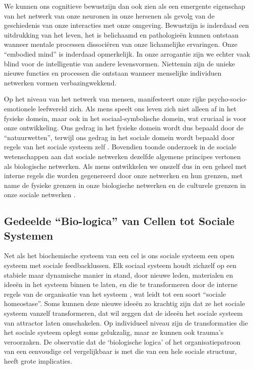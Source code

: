 \documentclass[
  11pt,
]{book}
\begin{document}
We kunnen ons cognitieve bewustzijn dan ook zien als een emergente eigenschap van het netwerk van onze neuronen in onze hersenen als gevolg van de geschiedenis van onze interacties met onze omgeving. Bewustzijn is inderdaad een uitdrukking van het leven, het is belichaamd en pathologieën kunnen ontstaan wanneer mentale processen dissociëren van onze lichamelijke ervaringen. Onze ``embodied mind'' is inderdaad opmerkelijk. In onze arrogantie zijn we echter vaak blind voor de intelligentie van andere levensvormen. Niettemin zijn de unieke nieuwe functies en processen die ontstaan wanneer menselijke individuen netwerken vormen verbazingwekkend.

Op het niveau van het netwerk van mensen, manifesteert onze rijke psycho-socio-emotionele leefwereld zich. Als mens speelt ons leven zich niet alleen af in het fysieke domein, maar ook in het sociaal-symbolische domein, wat cruciaal is voor onze ontwikkeling. Ons gedrag in het fysieke domein wordt dus bepaald door de ``natuurwetten'', terwijl ons gedrag in het sociale domein wordt bepaald door regels van het sociale systeem zelf \citep{capraLuisi2014}. Bovendien toonde onderzoek in de sociale wetenschappen aan dat sociale netwerken dezelfde algemene principes vertonen als biologische netwerken. Als mens ontwikkelen we onszelf dus in een geheel met interne regels die worden gegenereerd door onze netwerken en hun grenzen, met name de fysieke grenzen in onze biologische netwerken en de culturele grenzen in onze sociale netwerken \citep{capraLuisi2014}.

\subsection{Gedeelde ``Bio-logica'' van Cellen tot Sociale Systemen}\label{gedeelde-bio-logica-van-cellen-tot-sociale-systemen}

Net als het biochemische systeem van een cel is ons sociale systeem een open systeem met sociale feedbacklussen. Elk sociaal systeem houdt zichzelf op een stabiele maar dynamische manier in stand, door nieuwe leden, materialen en ideeën in het systeem binnen te laten, en die te transformeren door de interne regels van de organisatie van het systeem \citep{capraLuisi2014}, wat leidt tot een soort ``sociale homeostase''. Soms kunnen deze nieuwe ideeën zo krachtig zijn dat ze het sociale systeem vanzelf transformeren, dat wil zeggen dat de ideeën het sociale systeem van attractor laten omschakelen. Op individueel niveau zijn de transformaties die het sociale systeem oplegt soms gelukzalig, maar ze kunnen ook trauma's veroorzaken. De observatie dat de `biologische logica' of het organisatiepatroon van een eenvoudige cel vergelijkbaar is met die van een hele sociale structuur, heeft grote implicaties.
\end{document}
